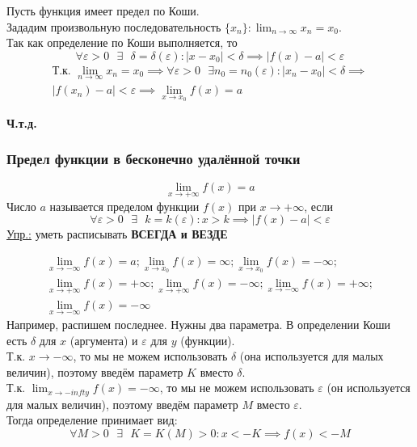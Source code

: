 \documentclass[12pt]{article}
\def\posl#1#2{\{#1_{#2}\}}
\begin{document}
\begin{adjustwidth}{1.5em}{1.5em}
\begin{enumerate}
            Пусть функция имеет предел по Коши.\\
            Зададим произвольную последовательность $\posl{x}{n} : \lim_{n\to\infty} x_n = x_0$.\\
            Так как определение по Коши выполняется, то
            \[
                \forall \varepsilon > 0 \text{ } \exists \text{ } \delta = \delta(\varepsilon) : |x - x_0| < \delta \implies |f(x) - a| < \varepsilon
            \]
            \begin{gather*}
                \text{Т.к. } \lim_{n\to\infty}x_n = x_0 \implies \forall \varepsilon > 0 \text{ } \exists n_0 = n_0(\varepsilon) : |x_n - x_0| < \delta \implies\\
                |f(x_n) - a| < \varepsilon \implies \lim_{x\to x_0} f(x) = a
            \end{gather*}
        \end{enumerate}
        \begin{center}
            \textbf{Ч.т.д.}
        \end{center}
    \end{adjustwidth}
    \subsubsection*{Предел функции в бесконечно удалённой точки}
    \[\lim_{x\to +\infty}f(x) = a\]
    Число $a$ называется пределом функции $f(x)$ при $x \to +\infty$, если 
    \[ \forall \varepsilon > 0 \text{ } \exists \text{ } k = k(\varepsilon) : x > k \implies |f(x) - a| < \varepsilon \]
    \underline{Упр.:} уметь расписывать \textbf{ВСЕГДА и ВЕЗДЕ}
    \begin{adjustwidth}{1.5em}{1.5em}
        \begin{gather*}
            \lim_{x\to -\infty}f(x) = a;
            \lim_{x\to x_0}f(x) = \infty;
            \lim_{x\to x_0}f(x) = -\infty;\\
            \lim_{x\to +\infty}f(x) = +\infty;
            \lim_{x\to +\infty}f(x) = -\infty;
            \lim_{x\to -\infty}f(x) = +\infty;\\
            \lim_{x\to -\infty}f(x) = -\infty
        \end{gather*}
        Например, распишем последнее.
        Нужны два параметра. В определении Коши есть $\delta$ для $x$ (аргумента) и $\varepsilon$ для $y$ (функции).\\
        Т.к. $x \to -\infty$, то мы не можем использовать $\delta$ (она используется для малых величин), поэтому введём параметр $K$ вместо $\delta$.\\
        Т.к. $\lim_{x\to -infty}f(x) = -\infty$, то мы не можем использовать $\varepsilon$ (он используется для малых величин), поэтому введём параметр $M$ вместо $\varepsilon$.\\
        Тогда определение принимает вид:
        \[
            \forall M > 0 \text{ } \exists \text{ } K = K(M) > 0 : x < -K \implies f(x) < -M
        \]
    \end{adjustwidth}
\end{document}
